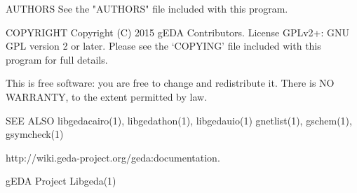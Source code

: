 AUTHORS
       See the "AUTHORS" file included with this program.

COPYRIGHT
       Copyright (C) 2015 gEDA Contributors. License GPLv2+: GNU GPL
       version 2 or later. Please see the `COPYING' file included with this
       program for full details.

       This is free software: you are free to change and redistribute it.
       There is NO WARRANTY, to the extent permitted by law.

SEE ALSO
       libgedacairo(1),  libgedathon(1), libgedauio(1) gnetlist(1), gschem(1),
       gsymcheck(1)

       http://wiki.geda-project.org/geda:documentation.



gEDA Project                                                        Libgeda(1)
